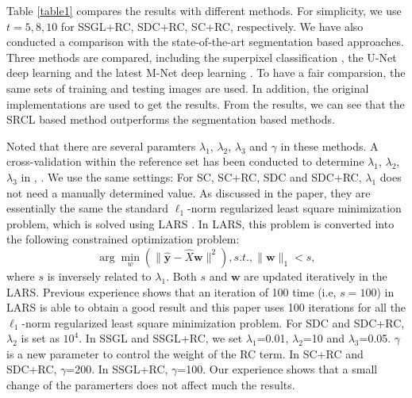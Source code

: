 \documentclass[journal]{IEEEtran}
\begin{document}
  Table \ref{table1} compares the results with different methods. For simplicity, we use $t=5, 8, 10$ for SSGL+RC, SDC+RC, SC+RC, respectively.  We have also conducted a comparison  with the state-of-the-art segmentation based approaches. Three methods are compared, including the superpixel classification \cite{tmi2013}, the U-Net deep learning \cite{Ronneberger2015} and the latest M-Net deep learning \cite{huazhu18}. To have a fair comparsion, the same sets of
  training and testing images are used. In addition, the original
  implementations are used to get the results. From the results, we can see that the SRCL based method outperforms the segmentation based methods.


Noted that there are several paramters $\lambda_1$, $\lambda_2$, $\lambda_3$ and $\gamma$ in
these methods. A cross-validation within the reference set
has been conducted to determine  $\lambda_1$, $\lambda_2$, $\lambda_3$ in \cite{CJ15}, \cite{Cheng:17BOE}. We
use the same settings: For SC, SC+RC, SDC and SDC+RC, $\lambda_1$ does not need a manually determined value. As discussed
in the paper, they are essentially the same the standard $\ell_1$-norm regularized least square minimization problem, which is
solved using LARS \cite{lars2004}. In LARS, this problem is converted
into the following constrained optimization problem:
 \begin{equation}
\arg \min_{w} (\|\hat{\textbf{y}}-\hat{X}\textbf{w} \|^2), s.t., \|\textbf{w} \|_1 < s,
	\end{equation}
  where $s$ is inversely related to $\lambda_1$. Both $s$ and $\textbf{w}$ are updated
 iteratively in the LARS. Previous experience \cite{CJ15} shows that
 an iteration of 100 time (i.e, $s=100$) in LARS is able to obtain
a good result and this paper uses 100 iterations for all the $\ell_1$-norm regularized least square minimization problem.
For SDC and SDC+RC, $\lambda_2$ is set as $10^4$.
In SSGL and SSGL+RC, we
 set $\lambda_1$=0.01, $\lambda_2$=10 and $\lambda_3$=0.05.
$\gamma$ is a new parameter to
control the weight of the RC term. In SC+RC and SDC+RC,
$\gamma$=200. In SSGL+RC,
$\gamma$=100. Our experience shows that a
small change of the paramerters does not affect much the
results.
\end{document}
